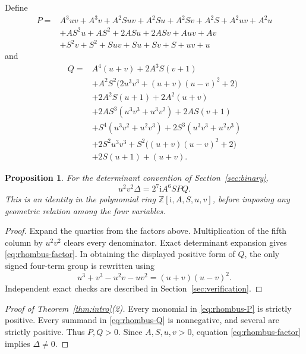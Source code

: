 \documentclass[11pt]{amsart}
\newtheorem{proposition}[theorem]{Proposition}
\theoremstyle{definition}
\newcommand{\ii}{\mathrm{i}}
\newcommand{\DeltaA}{\mathit{\Delta}}
\begin{document}
Define
\begin{equation}\label{eq:rhombus-P}
\begin{split}
P={}&A^3uv+A^3v+A^2Suv+A^2Su+A^2Sv+A^2S+A^2uv+A^2u\\
 &+AS^2u+AS^2+2ASu+2ASv+Auv+Av\\
 &+S^2v+S^2+Suv+Su+Sv+S+uv+u
\end{split}
\end{equation}
and
\begin{equation}\label{eq:rhombus-Q}
\begin{split}
Q={}&A^4(u+v)+2A^3S(v+1)\\
 &+A^2S^2\bigl(2u^3v^3+(u+v)(u-v)^2+2\bigr)\\
 &+2A^2S(u+1)+2A^2(u+v)\\
 &+2AS^3(u^3v^3+u^3v^2)+2AS(v+1)\\
 &+S^4(u^3v^2+u^2v^3)+2S^3(u^3v^3+u^2v^3)\\
 &+2S^2u^3v^3+S^2\bigl((u+v)(u-v)^2+2\bigr)\\
 &+2S(u+1)+(u+v).
\end{split}
\end{equation}

\begin{proposition}\label{prop:rhombus-factor}
For the determinant convention of Section~\ref{sec:binary},
\begin{equation}\label{eq:rhombus-factor}
u^2v^2\DeltaA=2^7\ii A^6SPQ.
\end{equation}
This is an identity in the polynomial ring
$\mathbb Z[\ii,A,S,u,v]$, before imposing any geometric relation among the
four variables.
\end{proposition}

\begin{proof}
Expand the quartics from the factors above. Multiplication of the fifth
column by $u^2v^2$ clears every denominator. Exact determinant expansion
gives \eqref{eq:rhombus-factor}. In obtaining the displayed positive form of
$Q$, the only signed four-term group is rewritten using
\begin{equation}\label{eq:square-regroup}
u^3+v^3-u^2v-uv^2=(u+v)(u-v)^2.
\end{equation}
Independent exact checks are described in Section~\ref{sec:verification}.
\end{proof}

\begin{proof}[Proof of Theorem~\ref{thm:intro}(2)]
Every monomial in \eqref{eq:rhombus-P} is strictly positive. Every summand
in \eqref{eq:rhombus-Q} is nonnegative, and several are strictly positive.
Thus $P,Q>0$. Since $A,S,u,v>0$, equation
\eqref{eq:rhombus-factor} implies $\DeltaA\ne0$.
\end{proof}
\end{document}
